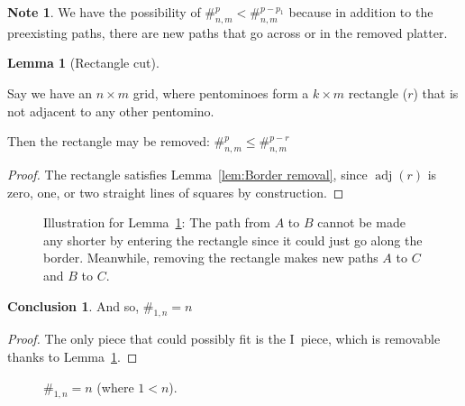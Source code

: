 \documentclass{article}
\theoremstyle{definition}%
\newtheorem{lemma}[theorem]{Lemma}
\newtheorem*{conclusion}{Conclusion}
\newtheorem*{note}{Note}
\newcommand{\adj}{\operatorname{adj}}
\begin{document}
\begin{note}
We have the possibility of $\#^{p}_{n, m} < \#^{p - p_1}_{n, m}$ because in addition to the preexisting paths, there are new paths that go across or in the removed platter.
\end{note}

\begin{lemma}[Rectangle cut]
\label{lem:Rectangle cut}

Say we have an $n \times m$ grid, where pentominoes form a $k \times m$ rectangle ($r$) that is not adjacent to any other pentomino.

Then the rectangle may be removed: $\#^{p}_{n, m} \le \#^{p - r}_{n, m}$
\end{lemma}

\begin{proof}
The rectangle satisfies Lemma~\ref{lem:Border removal}, since $\adj(r)$ is zero, one, or two straight lines of squares by construction.
\end{proof}

\begin{figure}[htbp!]
    \centering
    \caption{Illustration for Lemma~\ref{lem:Rectangle cut}: The path from $A$ to $B$ cannot be made any shorter by entering the rectangle since it could just go along the border. Meanwhile, removing the rectangle makes new paths $A$ to $C$ and $B$ to $C$.}
\end{figure}

\begin{conclusion}
And so, $\#_{1, n} = n$
\end{conclusion}

\begin{proof}
The only piece that could possibly fit is the I~piece, which is removable thanks to Lemma~\ref{lem:Rectangle cut}.
\end{proof}

\begin{figure}[htbp!]
    \centering
    \caption{$\#_{1, n} = n$ (where $1 < n$). \cite{sheet}}
\end{figure}
\end{document}
